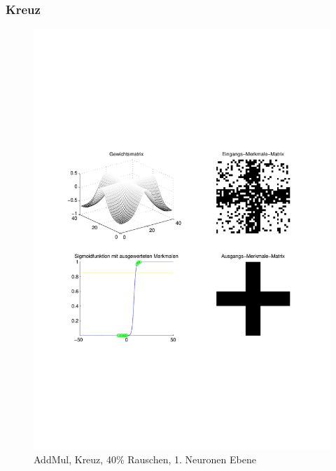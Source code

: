 \subsubsection{Kreuz}
\begin{figure}[hbt]
	\begin{minipage}{0.8 \textwidth}
		\includegraphics[width=\textwidth]{./Bilder/Auswertung/Endergebnis/TypeAddMul_Rauschen40_Cross_Layer1}
		\caption{AddMul, Kreuz, 40\% Rauschen, 1. Neuronen Ebene}
		\label{AddMul_Kreuz_40_1}
	\end{minipage}
	\vfill
	\begin{minipage}{0.8 \textwidth}

\end{minipage}
\end{figure}
